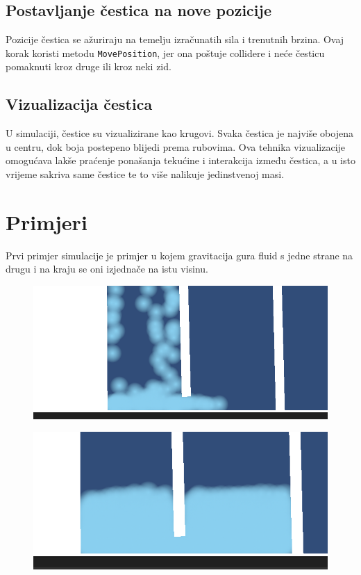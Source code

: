 \documentclass[diplomskirad]{fer}
\begin{document}
    \section{Postavljanje čestica na nove pozicije}\label{sec:postavljanje}
    Pozicije čestica se ažuriraju na temelju izračunatih sila i trenutnih brzina.
    Ovaj korak koristi metodu \texttt{MovePosition}, jer ona poštuje collidere i neće česticu pomaknuti kroz druge ili kroz neki zid.

    \section{Vizualizacija čestica}\label{sec:vizualizacija-cestica}
    U simulaciji, čestice su vizualizirane kao krugovi.
    Svaka čestica je najviše obojena u centru, dok boja postepeno blijedi prema rubovima.
    Ova tehnika vizualizacije omogućava lakše praćenje ponašanja tekućine i interakcija između čestica, a u isto vrijeme sakriva same čestice te to više nalikuje jedinstvenoj masi.

    \chapter{Primjeri}\label{pog:primjeri}

    Prvi primjer simulacije je primjer u kojem gravitacija gura fluid s jedne strane na drugu i na kraju se oni izjednače na istu visinu.

    \begin{figure}[H]
        \centering
        \includegraphics[scale=0.5]{images/prijeIzjednacenja}
        \label{fig:prije}
    \end{figure}

    \begin{figure}[H]
        \centering
        \includegraphics[scale=0.5]{images/poslijeIzjednacenja}
        \label{fig:poslije}
    \end{figure}
\end{document}
